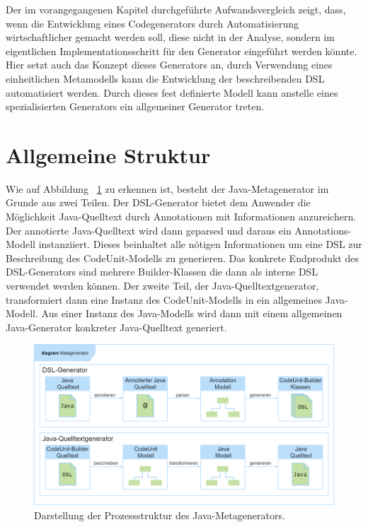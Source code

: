 \documentclass[12pt,oneside,a4paper,parskip]{scrbook}
\begin{document}
Der im vorangegangenen Kapitel durchgeführte Aufwandsvergleich zeigt, dass, wenn die Entwicklung eines Codegenerators durch Automatisierung wirtschaftlicher gemacht werden soll, diese nicht in der Analyse, sondern im eigentlichen Implementationsschritt für den Generator eingeführt werden könnte. Hier setzt auch das Konzept dieses Generators an, durch Verwendung eines einheitlichen Metamodells kann die Entwicklung der beschreibenden DSL automatisiert werden. Durch dieses fest definierte Modell kann anstelle eines spezialisierten Generators ein allgemeiner Generator treten.

\section{Allgemeine Struktur}

Wie auf Abbildung ~\ref{fig:meta1} zu erkennen ist, besteht der Java-Metagenerator im Grunde aus zwei Teilen. Der DSL-Generator bietet dem Anwender die Möglichkeit Java-Quelltext durch Annotationen mit Informationen anzureichern. Der annotierte Java-Quelltext wird dann geparsed und daraus ein Annotations-Modell instanziiert. Dieses beinhaltet alle nötigen Informationen um eine DSL zur Beschreibung des CodeUnit-Modells zu generieren. Das konkrete Endprodukt des DSL-Generators sind mehrere Builder-Klassen die dann als interne DSL verwendet werden können. Der zweite Teil, der Java-Quelltextgenerator, transformiert dann eine Instanz des CodeUnit-Modells in ein allgemeines Java-Modell. Aus einer Instanz des Java-Modells wird dann mit einem allgemeinen Java-Generator konkreter Java-Quelltext generiert.

\begin{figure}[htbp]
	\centering
	\includegraphics[width=1.0\textwidth]{bilder/metagenProzess}
	\caption{Darstellung der Prozessstruktur des Java-Metagenerators.}
	\label{fig:meta1}
\end{figure}
\end{document}
